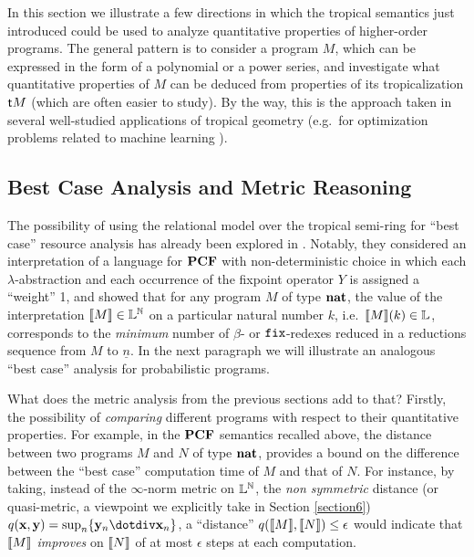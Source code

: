 

In this section we illustrate a few directions in which the tropical semantics just introduced could be used to analyze quantitative properties of higher-order programs. 
The general pattern is to consider a program $M$, which can be expressed in the form of a polynomial or a power series, and 
investigate what quantitative properties of $M$ can be deduced from properties of its tropicalization $\mathsf{t} M$ (which are often easier to study).
By the way, this is the approach taken in several well-studied applications of tropical geometry (e.g.~for optimization problems related to machine learning \cite{}).



\subsection{Best Case Analysis and Metric Reasoning}

The possibility of using the relational model over the tropical semi-ring for ``best case'' resource analysis has already been explored in \cite{Manzo}. Notably, they considered an interpretation of a language for $\mathbf{PCF}$ with non-deterministic choice in which each $\lambda$-abstraction and each occurrence of the fixpoint operator $Y$ is assigned a ``weight'' 1, and showed that for any program $M$ of type $\mathbf{nat}$, 
the value of the interpretation $\llbracket M\rrbracket\in \mathbb{L}^{\mathbb{N}}$ on a particular natural number $k$, i.e.~$\llbracket M\rrbracket(k)\in \mathbb{L}$, corresponds to the \emph{minimum} number of $\beta$- or $\mathtt{fix}$-redexes reduced in a reductions sequence from $M$ to $\underline n$. 
In the next paragraph we will illustrate an analogous ``best case'' analysis for probabilistic programs.

What does the metric analysis from the previous sections add to that? Firstly, the possibility of \emph{comparing} different programs with respect to their quantitative properties. For example, in the $\mathbf{PCF}$ semantics recalled above, the distance between two programs $M$ and $N$ of type $\mathbf{nat}$, provides a bound on the difference between the  ``best case'' computation time of $M$ and that of $N$. For instance, by taking, instead of the $\infty$-norm metric on $\mathbb{L}^{\mathbb{N}}$,  
the \emph{non symmetric} distance (or quasi-metric, a viewpoint we explicitly take in Section \ref{section6}) $q(\B x, \B y)=\sup_{n}\{\B y_{n}\dotdiv \B x_{n}\}$, a ``distance'' $q(\llbracket M\rrbracket,\llbracket N\rrbracket)\leq \epsilon$ would indicate that $\llbracket M\rrbracket$ \emph{improves} on $\llbracket N\rrbracket$ of at most $\epsilon$ steps at each computation. 

